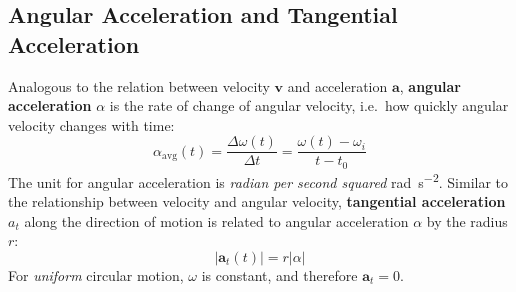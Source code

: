 
%  
%
%
%
%


\subsection{Angular Acceleration and Tangential Acceleration}
Analogous to the relation between velocity $\bm v$ and acceleration
$\bm a$, \textbf{angular acceleration} $\alpha$ is the rate of change of
angular velocity, i.e.\ how quickly angular velocity changes with time:
\begin{equation}
  \boxed{
    \alpha_\text{avg}(t)=\frac{\Delta\omega(t)}{\Delta t}
    =\frac{\omega(t)-\omega_i}{t-t_0}
  }
\end{equation}
The unit for angular acceleration is \emph{radian per second squared}
\si{\radian\per\second\squared}.
Similar to the relationship between velocity and angular velocity,
\textbf{tangential acceleration} $a_t$ along the direction of motion is related
to angular acceleration $\alpha$ by the radius $r$:
\begin{equation}
  \boxed{
    |\bm a_t(t)|=r|\alpha|
  }
\end{equation}
For \emph{uniform} circular motion, $\omega$ is constant, and therefore
$\bm a_t=0$.

